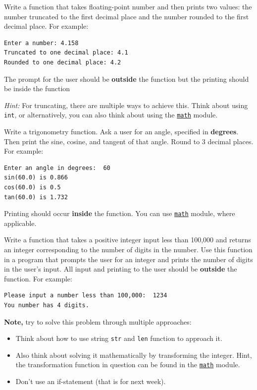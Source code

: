 \documentclass{../pset}
\begin{document}
\begin{problem}
 Write a function that takes floating-point number and then prints two values: the number truncated to the first decimal place and the number rounded to the first decimal place. For example:

\begin{lstlisting}[language={}]
Enter a number: 4.158
Truncated to one decimal place: 4.1
Rounded to one decimal place: 4.2
\end{lstlisting}
The prompt for the user should be \textbf{outside} the function but the printing should be inside the function

\textit{Hint:} For truncating, there are multiple ways to achieve this. Think about using \lstinline|int|, or alternatively, you can also think about using the \href{https://docs.python.org/3/library/math.html}{\lstinline|math|} module.
\end{problem}


\begin{problem}

Write a  trigonometry function. Ask a user for an angle, specified in \textbf{degrees}. Then print the sine, cosine, and tangent of that angle. Round to 3 decimal places. For example:
\begin{lstlisting}[language={}]
Enter an angle in degrees:  60
sin(60.0) is 0.866
cos(60.0) is 0.5
tan(60.0) is 1.732
\end{lstlisting}



Printing should occur \textbf{inside} the function. You can use \href{https://docs.python.org/3/library/math.html}{\lstinline|math|} module, where applicable.
\end{problem}

\begin{problem}


Write a function that takes a positive integer input less than 100,000 and returns an integer corresponding to the number of digits in the number. Use this function in a program that prompts the user for an integer and prints the number of digits in the user's input. All input and printing to the user should be \textbf{outside} the function. For example:
\begin{lstlisting}[language={}]
Please input a number less than 100,000:  1234
You number has 4 digits.
\end{lstlisting}



\textbf{Note,}  try to solve this problem through multiple approaches:
\begin {itemize}
\item Think about how to use string \lstinline|str| and \lstinline|len| function to approach it.
\item Also think about solving it mathematically by transforming the integer. Hint, the transformation function in question can be found in the \href{https://docs.python.org/3/library/math.html}{\lstinline|math|} module.
\item Don't use an if-statement (that is for next week). 
\end{itemize}
\end{problem}
\end{document}

